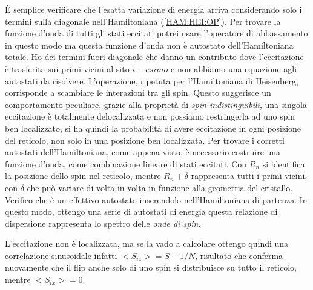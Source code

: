 \`E semplice verificare che l'esatta variazione di energia arriva considerando solo i termini sulla diagonale nell'Hamiltoniana (\ref{HAM:HEI:OP}). 
Per trovare la funzione d'onda di tutti gli stati eccitati potrei usare l'operatore di abbassamento in questo modo
ma questa funzione d'onda non \`e autostato dell'Hamiltoniana totale. Ho dei termini fuori diagonale che  danno un contributo
dove l'eccitazione \`e trasferita sui primi vicini al sito $i-esimo$ e non abbiamo una equazione agli autostati da risolvere. L'operazione, ripetuta per l'Hamiltoniana di Heisenberg, corrisponde a scambiare le interazioni tra gli spin. Questo suggerisce un comportamento peculiare, grazie alla propriet\`a di \textit{spin indistinguibili}, una singola eccitazione \`e totalmente delocalizzata e non possiamo restringerla ad uno spin ben localizzato, si ha quindi la probabilit\`a di avere eccitazione in ogni posizione del reticolo, non solo in una posizione ben localizzata.
Per trovare i corretti autostati dell'Hamiltoniana, come appena visto, \`e necessario costruire una funzione d'onda, come combinazione lineare di stati eccitati. Con $R_n$ si identifica la posizione dello spin nel reticolo, mentre $R_n+\delta$ rappresenta tutti i primi vicini, con $\delta$ che pu\`o variare di volta in volta in funzione alla geometria del cristallo.
Verifico che \`e un effettivo autostato inserendolo nell'Hamiltoniana di partenza. In questo modo, ottengo una serie di autostati di energia
questa relazione di dispersione rappresenta lo spettro delle \textit{onde di spin}.

L'eccitazione non \`e localizzata, ma se la vado a calcolare ottengo
quindi una correlazione sinusoidale infatti $<S_{iz}> = S - 1/N$, risultato che conferma nuovamente che il flip anche solo di uno spin si distribuisce su tutto il reticolo, mentre $<S_{ix}> =0$.

